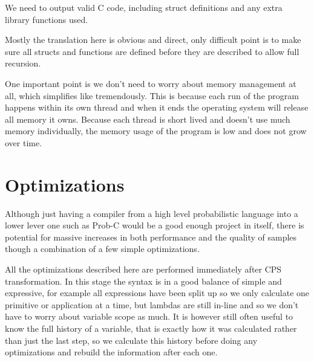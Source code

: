 \documentclass[a4paper]{article}
\begin{document}
We need to output valid C code, including struct definitions and any extra library functions used.

Mostly the translation here is obvious and direct, only difficult point is to make sure all structs and functions are defined before they are described to allow full recursion.

One important point is we don't need to worry about memory management at all, which simplifies like tremendously. This is because each run of the program happens within its own thread and when it ends the operating system will release all memory it owns. Because each thread is short lived and doesn't use much memory individually, the memory usage of the program is low and does not grow over time.




\section{Optimizations}

Although just having a compiler from a high level probabilistic language into a lower lever one such as Prob-C would be a good enough project in itself, there is potential for massive increases in both performance and the quality of samples though a combination of a few simple optimizations.

All the optimizations described here are performed immediately after CPS transformation. In this stage the syntax is in a good balance of simple and expressive, for example all expressions have been split up so we only calculate one primitive or application at a time, but lambdas are still in-line and so we don't have to worry about variable scope as much. It is however still often useful to know the full history of a variable, that is exactly how it was calculated rather than just the last step, so we calculate this history before doing any optimizations and rebuild the information after each one.
\end{document}
